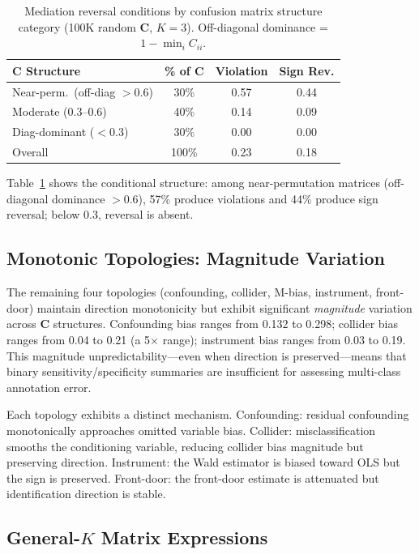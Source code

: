 \documentclass[11pt,letterpaper]{article}
\begin{document}
\begin{table}[t]
\centering
\small
\caption{Mediation reversal conditions by confusion matrix structure category (100K random $\mathbf{C}$, $K=3$). Off-diagonal dominance = $1 - \min_i C_{ii}$.}
\label{tab:mediation_conditions}
\begin{tabular}{@{}lccc@{}}
\toprule
\textbf{$\mathbf{C}$ Structure} & \textbf{\% of $\mathbf{C}$} & \textbf{Violation} & \textbf{Sign Rev.} \\
\midrule
Near-perm.\ (off-diag $> 0.6$) & 30\% & 0.57 & 0.44 \\
Moderate (0.3--0.6) & 40\% & 0.14 & 0.09 \\
Diag-dominant ($< 0.3$) & 30\% & 0.00 & 0.00 \\
\midrule
Overall & 100\% & 0.23 & 0.18 \\
\bottomrule
\end{tabular}
\end{table}

Table~\ref{tab:mediation_conditions} shows the conditional structure: among near-permutation matrices (off-diagonal dominance $> 0.6$), 57\% produce violations and 44\% produce sign reversal; below 0.3, reversal is absent.

\subsection{Monotonic Topologies: Magnitude Variation}

The remaining four topologies (confounding, collider, M-bias, instrument, front-door) maintain direction monotonicity but exhibit significant \emph{magnitude} variation across $\mathbf{C}$ structures.
Confounding bias ranges from 0.132 to 0.298; collider bias ranges from 0.04 to 0.21 (a 5$\times$ range); instrument bias ranges from 0.03 to 0.19.
This magnitude unpredictability---even when direction is preserved---means that binary sensitivity/specificity summaries are insufficient for assessing multi-class annotation error.

Each topology exhibits a distinct mechanism.
Confounding: residual confounding monotonically approaches omitted variable bias.
Collider: misclassification smooths the conditioning variable, reducing collider bias magnitude but preserving direction.
Instrument: the Wald estimator is biased toward OLS but the sign is preserved.
Front-door: the front-door estimate is attenuated but identification direction is stable.


\subsection{General-$K$ Matrix Expressions}
\label{sec:generalk}
\end{document}

